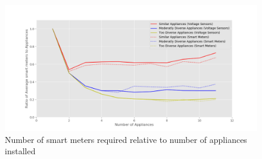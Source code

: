 \begin{figure} 
	\centering
	\includegraphics[width=1\linewidth]{images/sim_V_b}
	\caption[Number of smart meters required relative to number of appliances installed]{Number of smart meters required relative to number of appliances installed}
	\label{fig:sim_V_b}
	\vspace*{-3ex}
\end{figure}

